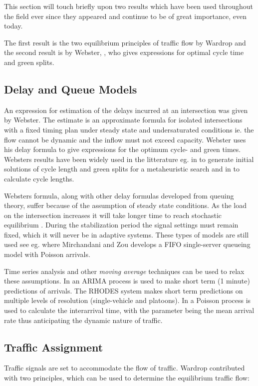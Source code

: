 \label{history}
This section will touch briefly upon two results which have been used throughout the field ever since they appeared and continue to be of great importance, even today. 

The first result is the two equilibrium principles of traffic flow by Wardrop \cite{Wardrop} and the second result is by Webster, \cite{Webster}, who gives expressions for optimal cycle time and green splits.

\subsection{Delay and Queue Models}
\label{webster}
An expression for estimation of the delays incurred at an intersection was given by Webster. The estimate is an approximate formula for isolated intersections with a fixed timing plan under steady state and undersaturated conditions ie. the flow cannot be dynamic and the inflow must not exceed capacity. 
Webster uses his delay formula to give expressions for the optimum cycle- and green times. 
Websters results have been widely used in the litterature eg. in \cite{1} to generate initial solutions of cycle length and green splits for a metaheuristic search and in \cite{30} to calculate cycle lengths.

Websters formula, along with other delay formulas developed from queuing theory, suffer because of the assumption of steady state conditions. As the load on the intersection increases it will take longer time to reach stochastic equilibrium \cite{traffictheory}. During the stabilization period the signal settings must remain fixed, which it will never be in adaptive systems. These types of models are still used see eg. \cite{38} where Mirchandani and Zou develops a FIFO single-server queueing model with Poisson arrivals.

Time series analysis and other \textit{moving average} techniques can be used to relax these assumptions. In \cite{shortpredict} an ARIMA process is used to make short term (1 minute) predictions of arrivals. The RHODES system \cite{44} makes short term predictions on multiple levels of resolution (single-vehicle and platoons). In \cite{1}                                                                                          a Poisson process is used to calculate the interarrival time, with the parameter being the mean arrival rate thus anticipating the dynamic nature of traffic.

\subsection{Traffic Assignment}
\label{usereq}
Traffic signals are set to accommodate the flow of traffic. Wardrop contributed with two principles, which can be used to determine the equilibrium traffic flow:

